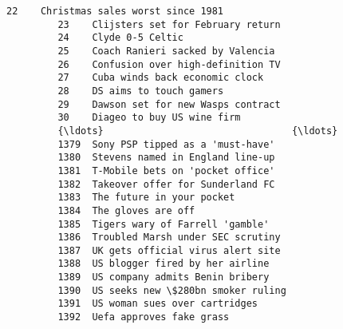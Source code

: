 \documentclass[11pt]{article}
\begin{document}
\begin{Verbatim}[commandchars=\\\{\}]
         22    Christmas sales worst since 1981                                                            
         23    Clijsters set for February return                                                           
         24    Clyde 0-5 Celtic                                                                            
         25    Coach Ranieri sacked by Valencia                                                            
         26    Confusion over high-definition TV                                                           
         27    Cuba winds back economic clock                                                              
         28    DS aims to touch gamers                                                                     
         29    Dawson set for new Wasps contract                                                           
         30    Diageo to buy US wine firm                                                                  
         {\ldots}                                 {\ldots}                                                           
         1379  Sony PSP tipped as a 'must-have'                                                            
         1380  Stevens named in England line-up                                                            
         1381  T-Mobile bets on 'pocket office'                                                            
         1382  Takeover offer for Sunderland FC                                                            
         1383  The future in your pocket                                                                   
         1384  The gloves are off                                                                          
         1385  Tigers wary of Farrell 'gamble'                                                             
         1386  Troubled Marsh under SEC scrutiny                                                           
         1387  UK gets official virus alert site                                                           
         1388  US blogger fired by her airline                                                             
         1389  US company admits Benin bribery                                                             
         1390  US seeks new \$280bn smoker ruling                                                           
         1391  US woman sues over cartridges                                                               
         1392  Uefa approves fake grass                                                                    

\end{Verbatim}
\end{document}

